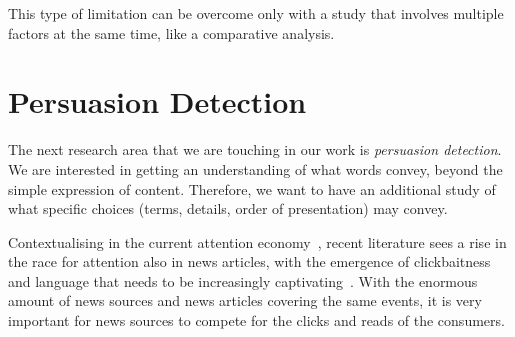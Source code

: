 This type of limitation can be overcome only with a study that involves multiple factors at the same time, like a comparative analysis.

\section{\statusgreen Persuasion Detection}
\label{sec:lit_persuasion}

The next research area that we are touching in our work is \emph{persuasion detection}.
We are interested in getting an understanding of what words convey, beyond the simple expression of content.
Therefore, we want to have an additional study of what specific choices (terms, details, order of presentation) may convey.



Contextualising in the current attention economy~\citep{davenport2001attention}, recent literature sees a rise in the race for attention also in news articles, with the emergence of clickbaitness and language that needs to be increasingly captivating~\citep{bazaco2019clickbait,davenport2001attention}.
With the enormous amount of news sources and news articles covering the same events, it is very important for news sources to compete for the clicks and reads of the consumers.

